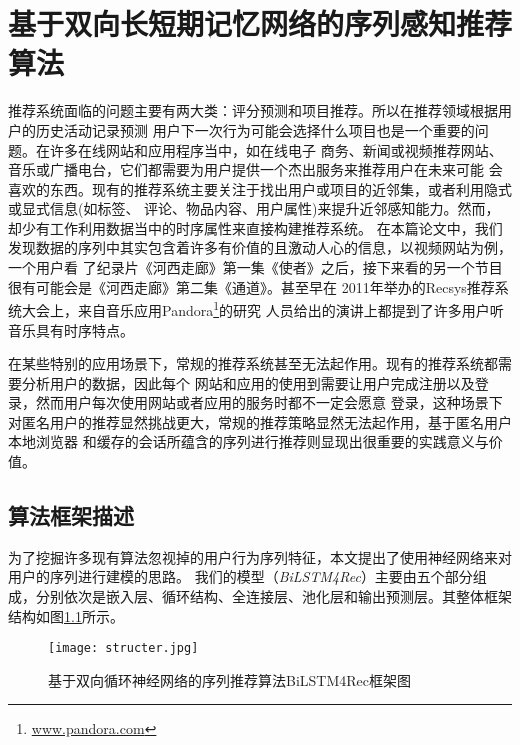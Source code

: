 ﻿%
\chapter{基于双向长短期记忆网络的序列感知推荐算法}

推荐系统面临的问题主要有两大类：评分预测和项目推荐。所以在推荐领域根据用户的历史活动记录预测%
用户下一次行为可能会选择什么项目也是一个重要的问题。在许多在线网站和应用程序当中，如在线电子%
商务、新闻或视频推荐网站、音乐或广播电台，它们都需要为用户提供一个杰出服务来推荐用户在未来可能%
会喜欢的东西。现有的推荐系统主要关注于找出用户或项目的近邻集，或者利用隐式或显式信息(如标签、%
评论、物品内容、用户属性)来提升近邻感知能力。然而，却少有工作利用数据当中的时序属性来直接构建推荐系统。%
在本篇论文中，我们发现数据的序列中其实包含着许多有价值的且激动人心的信息，以视频网站为例，一个用户看%
了纪录片《河西走廊》第一集《使者》之后，接下来看的另一个节目很有可能会是《河西走廊》第二集《通道》。甚至早在%
2011年举办的Recsys推荐系统大会上，来自音乐应用Pandora\footnote{\url{www.pandora.com}}的研究%
人员给出的演讲上都提到了许多用户听音乐具有时序特点。%

在某些特别的应用场景下，常规的推荐系统甚至无法起作用。现有的推荐系统都需要分析用户的数据，因此每个%
网站和应用的使用到需要让用户完成注册以及登录，然而用户每次使用网站或者应用的服务时都不一定会愿意%
登录，这种场景下对匿名用户的推荐显然挑战更大，常规的推荐策略显然无法起作用，基于匿名用户本地浏览器%
和缓存的会话所蕴含的序列进行推荐则显现出很重要的实践意义与价值。

\section{算法框架描述}

为了挖掘许多现有算法忽视掉的用户行为序列特征，本文提出了使用神经网络来对用户的序列进行建模的思路。%
我们的模型（\textit{BiLSTM4Rec}）主要由五个部分组成，分别依次是嵌入层、循环结构、全连接层、池化层和输出预测层。其整体框架%
结构如图\ref{fig:structer}所示。

\begin{figure}[htb]
  \centering
  \texttt{[image: structer.jpg]}\\
  \caption{基于双向循环神经网络的序列推荐算法BiLSTM4Rec框架图}
  \label{fig:structer}
\end{figure}

